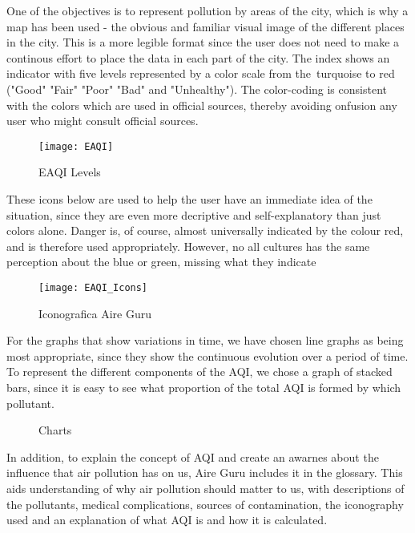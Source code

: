One of the objectives is to represent pollution by areas of the city, which is why a map has been used - the 
obvious and familiar visual image of the different places in the city. This is a more legible format since the user
does not need to make a continous effort to place the data in each part of the city. The index shows an indicator with 
five levels represented by a color scale from the turquoise to red ("Good" "Fair" "Poor" "Bad" and "Unhealthy"). 
The color-coding is consistent with the colors which are used in official sources, thereby avoiding onfusion any 
user who might consult official sources.

\begin{figure}[ht]
    \centering
    \texttt{[image: EAQI]}
    \caption{EAQI Levels}
\end{figure}

These icons below are used to help the user have an immediate idea of the situation, since they are even more
decriptive and self-explanatory than just colors alone. Danger is, of course, almost universally indicated by 
the colour red, and is therefore used appropriately. However, no all cultures has the same perception about
the blue or green, missing what they indicate\\

\begin{figure}[ht]
    \centering
    \texttt{[image: EAQI\_Icons]}
    \caption{Iconografica Aire Guru}
\end{figure}

For the graphs that show variations in time,  we have chosen line graphs as being most appropriate,
since they show the continuous evolution over a period of time. To represent the different components of the AQI, we chose a
graph of stacked bars, since it is easy to see what proportion of the total AQI is formed by which pollutant. \\

\begin{figure}[ht]
    \centering
        \hfill
    \caption{Charts}
\end{figure}

In addition, to explain the concept of AQI and create an awarnes about the influence that air pollution has on us, Aire Guru includes it in the
glossary. This aids understanding of why air pollution should matter to us, with descriptions of the pollutants, medical complications, sources of contamination, the iconography used and
an explanation of what AQI is and how it is calculated. \\

